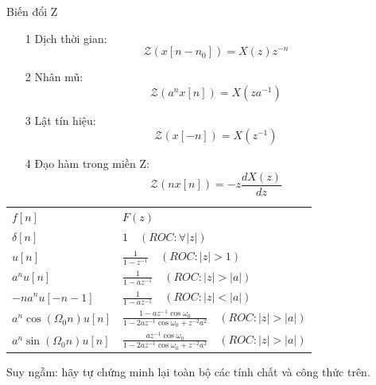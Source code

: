\documentclass[8pt]{beamer}
\begin{document}
\begin{frame}{Biến đổi Z}
\begin{enumerate}
\item[1]  Dịch thời gian: $$\mathscr{Z}(x[n-n_{0}])=X(z)z^{-n}$$
\item[2]  Nhân mũ: $$\mathscr{Z}(a^{n}x[n])=X(za^{-1})$$
\item[3]  Lật tín hiệu: $$\mathscr{Z}(x[-n])=X(z^{-1})$$
\item[4] Đạo hàm trong miền Z: $$\mathscr{Z}(nx[n])=-z\frac{dX(z)}{dz}$$
\end{enumerate}
\begin{center}
\begin{tabular}{ |l|l| } 
 \hline
 $f[n]$ & $F(z)$ \\ 
 $\delta[n]$ & $1 \quad (ROC: \forall |z|)$ \\ 
 $u[n]$ &   $\frac{1}{1-z^{-1}} \quad (ROC: |z|>1)$ \\ 
 $a^n u[n]$ & $\frac{1}{1-az^{-1}}\quad (ROC: |z|>|a|)$\\
 $-na^n u[-n-1]$ & $\frac{1}{1-az^{-1}}\quad (ROC: |z|<|a|)$\\
 $a^{n}\cos(\Omega_{0}n)u[n]$ &$\frac{1-az^{-1}\cos{\omega_{0}}}{1-2az^{-1}\cos{\omega_{0}}+z^{-2} a^2}  \quad (ROC: |z|>|a|)$\\

 $a^{n}\sin(\Omega_{0}n)u[n]$ &$\frac{az^{-1}\cos{\omega_{0}}}{1-2az^{-1}\cos{\omega_{0}}+z^{-2} a^2}  \quad (ROC: |z|>|a|)$\\
 \hline
\end{tabular}
\end{center}
Suy ngẫm: hãy tự chứng minh lại toàn bộ các tính chất và công thức trên.
\end{frame}
\end{document}
